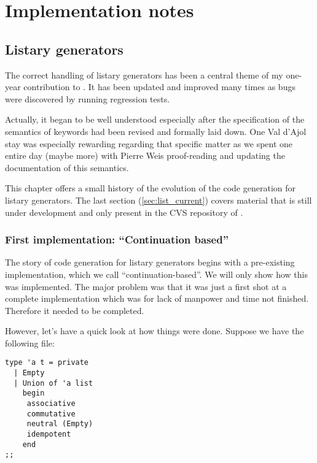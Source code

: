 \chapter{Implementation notes}
\label{chap:listary}



\section{Listary generators}
\label{sec:listary_generators}


The correct handling of listary generators has been a central theme of
my one-year contribution to \moca. It has been updated and improved
many times as bugs were discovered by running regression tests.

Actually, it began to be well understood especially after the specification
of the semantics of keywords had been revised and formally laid
down. One Val d'Ajol stay was especially rewarding regarding that
specific matter as we spent one entire day (maybe more) with Pierre
Weis proof-reading and updating the documentation of this semantics.

This chapter offers a small history of the evolution of the code
generation for listary generators. The last section
(\ref{sec:list_current}) covers material that is still under
development and only present in the CVS repository of \moca.

\subsection{First implementation: ``Continuation based'' }
\label{sec:first_list}

The story of code generation for listary generators begins with a
pre-existing implementation, which we call ``continuation-based''. We
will only show how this was implemented. The major problem was that it
was just a first shot at a complete implementation which was for lack
of manpower and time not finished. Therefore it needed to be completed.

However, let's have a quick look at how things were done. Suppose we
have the following \mlm file:
\begin{lstlisting}[label=lst:code]
type 'a t = private
  | Empty
  | Union of 'a list
    begin
     associative
     commutative
     neutral (Empty)
     idempotent
    end
;;
\end{lstlisting}


